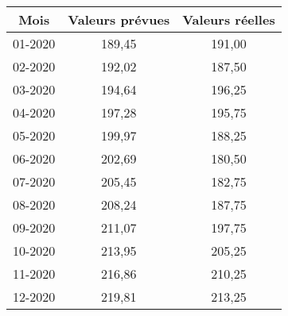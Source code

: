 \begin{tabular}{ccc}
\toprule
Mois & Valeurs prévues & Valeurs réelles \\
\midrule
01-2020 & 189,45 & 191,00 \\
02-2020 & 192,02 & 187,50 \\
03-2020 & 194,64 & 196,25 \\
04-2020 & 197,28 & 195,75 \\
05-2020 & 199,97 & 188,25 \\
06-2020 & 202,69 & 180,50 \\
07-2020 & 205,45 & 182,75 \\
08-2020 & 208,24 & 187,75 \\
09-2020 & 211,07 & 197,75 \\
10-2020 & 213,95 & 205,25 \\
11-2020 & 216,86 & 210,25 \\
12-2020 & 219,81 & 213,25 \\
\bottomrule
\end{tabular}%
